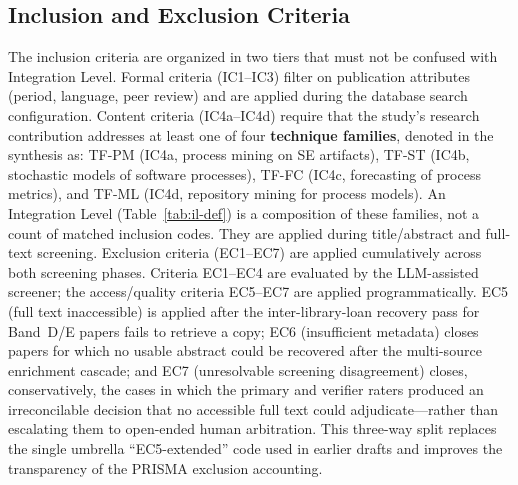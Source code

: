 \subsection{Inclusion and Exclusion Criteria}
\label{sec:slr-criteria}

The inclusion criteria are organized in two tiers that must not be confused
with Integration Level. Formal criteria (IC1--IC3) filter on publication
attributes (period, language, peer review) and are applied during the
database search configuration. Content criteria (IC4a--IC4d) require that the
study's research contribution addresses at least one of four
\textbf{technique families}, denoted in the synthesis as:
TF-PM (IC4a, process mining on SE artifacts),
TF-ST (IC4b, stochastic models of software processes),
TF-FC (IC4c, forecasting of process metrics), and
TF-ML (IC4d, repository mining for process models).
An Integration Level (Table~\ref{tab:il-def}) is a composition of these
families, not a count of matched inclusion codes. They are applied during title/abstract and
full-text screening. Exclusion criteria (EC1--EC7) are applied cumulatively
across both screening phases. Criteria EC1--EC4 are evaluated by the
LLM-assisted screener; the access/quality criteria EC5--EC7 are applied
programmatically. EC5 (full text inaccessible) is applied after the
inter-library-loan recovery pass for Band~D/E papers fails to retrieve a
copy; EC6 (insufficient metadata) closes papers for which no usable abstract
could be recovered after the multi-source enrichment cascade; and EC7
(unresolvable screening disagreement) closes, conservatively, the cases in
which the primary and verifier raters produced an irreconcilable decision
that no accessible full text could adjudicate---rather than escalating them
to open-ended human arbitration. This three-way split replaces the single
umbrella ``EC5-extended'' code used in earlier drafts and improves the
transparency of the PRISMA exclusion accounting.


